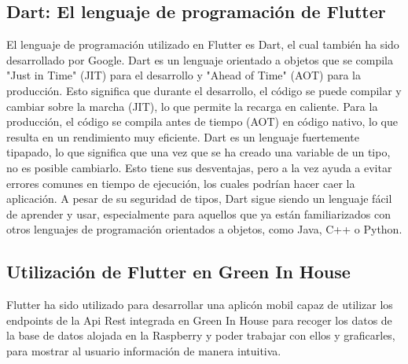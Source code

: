     \subsection{Dart: El lenguaje de programación de Flutter}
    El lenguaje de programación utilizado en Flutter es Dart, el cual también ha sido desarrollado por Google. Dart es un lenguaje orientado a objetos que se compila "Just in Time" (JIT) para el desarrollo y "Ahead of Time" (AOT) para la producción. Esto significa que durante el desarrollo, el código se puede compilar y cambiar sobre la marcha (JIT), lo que permite la recarga en caliente. Para la producción, el código se compila antes de tiempo (AOT) en código nativo, lo que resulta en un rendimiento muy eficiente.
    Dart es un lenguaje fuertemente tipapado, lo que significa que una vez que se ha creado una variable de un tipo, no es posible cambiarlo. Esto tiene sus desventajas, pero a la vez ayuda a evitar errores comunes en tiempo de ejecución, los cuales podrían hacer caer la aplicación. A pesar de su seguridad de tipos, Dart sigue siendo un lenguaje fácil de aprender y usar, especialmente para aquellos que ya están familiarizados con otros lenguajes de programación orientados a objetos, como Java, C++ o Python.
    \subsection{Utilización de Flutter en Green In House}
    Flutter ha sido utilizado para desarrollar una aplicón mobil capaz de utilizar los endpoints de la Api Rest integrada en Green In House para recoger los datos de la base de datos alojada en la Raspberry y poder trabajar con ellos y graficarles, para mostrar al usuario información de manera intuitiva.

